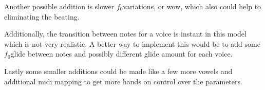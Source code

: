 \documentclass{article}
\newcommand{\fo}{$f_0$}
\begin{document}
Another possible addition is slower \fo  variations, or wow, which also could help to eliminating the beating.

Additionally, the transition between notes for a voice is instant in this model which is not very realistic. A better way to implement this would be to add some \fo  glide between notes and possibly different glide amount for each voice.

Lastly some smaller additions could be made like a few more vowels and additional midi mapping to get more hands on control over the parameters.


\end{document}
